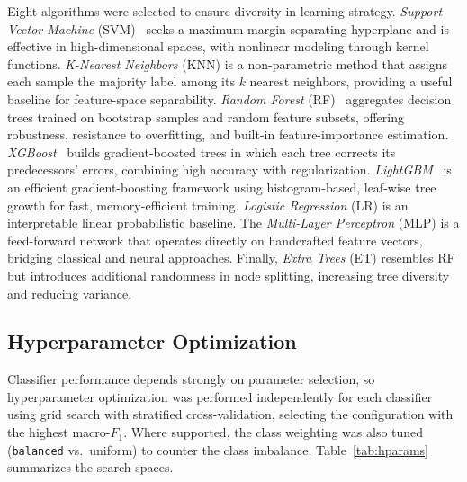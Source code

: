 Eight algorithms were selected to ensure diversity in learning strategy.
\emph{Support Vector Machine} (SVM)~\cite{cortes1995} seeks a maximum-margin
separating hyperplane and is effective in high-dimensional spaces, with
nonlinear modeling through kernel functions. \emph{K-Nearest Neighbors} (KNN)
is a non-parametric method that assigns each sample the majority label among its
$k$ nearest neighbors, providing a useful baseline for feature-space
separability. \emph{Random Forest} (RF)~\cite{breiman2001} aggregates decision
trees trained on bootstrap samples and random feature subsets, offering
robustness, resistance to overfitting, and built-in feature-importance
estimation. \emph{XGBoost}~\cite{chen2016} builds gradient-boosted trees in which
each tree corrects its predecessors' errors, combining high accuracy with
regularization. \emph{LightGBM}~\cite{ke2017} is an efficient gradient-boosting
framework using histogram-based, leaf-wise tree growth for fast, memory-efficient
training. \emph{Logistic Regression} (LR) is an interpretable linear
probabilistic baseline. The \emph{Multi-Layer Perceptron} (MLP) is a feed-forward
network that operates directly on handcrafted feature vectors, bridging classical
and neural approaches. Finally, \emph{Extra Trees} (ET) resembles RF but
introduces additional randomness in node splitting, increasing tree diversity and
reducing variance.

\subsection{Hyperparameter Optimization}
\label{sec:phase2_hyperparams}

Classifier performance depends strongly on parameter selection, so hyperparameter
optimization was performed independently for each classifier using grid search
with stratified cross-validation, selecting the configuration with the highest
macro-$F_1$. Where supported, the class weighting was also tuned
(\texttt{balanced} vs.\ uniform) to counter the class imbalance.
Table~\ref{tab:hparams} summarizes the search spaces.

